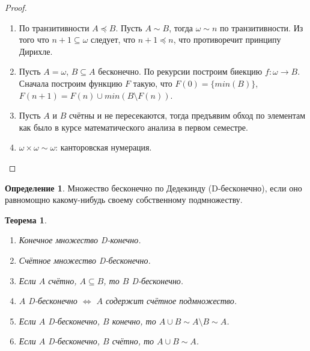 \documentclass[a4paper, 12pt]{article}
\theoremstyle{definition}
\newtheorem*{definition}{Определение}
\theoremstyle{plain}
\newtheorem*{theorem}{Теорема}
\theoremstyle{remark}
\begin{document}
  \begin{proof}
    \begin{enumerate}
      \item По транзитивности $A\preceq B$. Пусть $A\sim B$, тогда $\omega\sim n$ по транзитивности. Из того что $n+1\subseteq\omega$ следует, что $n+1\preceq n$, что противоречит принципу Дирихле.
      \item Пусть $A=\omega$, $B\subseteq A$ бесконечно. По рекурсии построим биекцию $f:\omega\to B$. Сначала построим функцию $F$ такую, что $F(0)=\{min(B)\}$, $F(n+1)=F(n)\cup min(B\setminus F(n))$.
      \item Пусть $A$ и $B$ счётны и не пересекаются, тогда предъявим обход по элементам как было в курсе математического анализа в первом семестре.
      \item $\omega\times\omega\sim\omega$: канторовская нумерация.
    \end{enumerate}
  \end{proof}
  \begin{definition}
    Множество бесконечно по Дедекинду (D-бесконечно), если оно равномощно какому-нибудь своему собственному подмножеству.
  \end{definition}
  \begin{theorem}
    \begin{enumerate}
      \item Конечное множество D-конечно.
      \item Счётное множество D-бесконечно.
      \item Если $A$ счётно, $A\subseteq B$, то $B$ D-бесконечно.
      \item $A$ D-бесконечно $\Longleftrightarrow$ $A$ содержит счётное подмножество.
      \item Если $A$ D-бесконечно, $B$ конечно, то $A\cup B\sim A\setminus B\sim A$.
      \item Если $A$ D-бесконечно, $B$ счётно, то $A\cup B\sim A$.
    \end{enumerate}
  \end{theorem}
\end{document}
